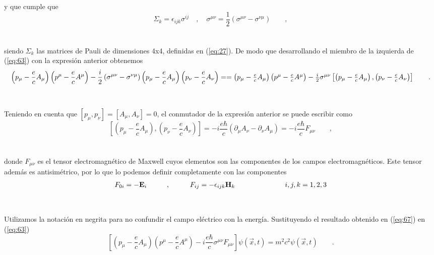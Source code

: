 \documentclass[11pt,letterpaper]{article}     %
\begin{document}
y que cumple que
\begin{equation} \label{eq:65}
\Sigma_k=\epsilon_{ijk} \sigma^{ij} \quad , \quad \sigma^{\mu \nu}=\frac{1}{2}(\sigma^{\mu \nu} - \sigma^{\nu \mu}) \qquad ,
\end{equation} \\ \\
siendo $\Sigma_k$ las matrices de Pauli de dimensiones 4x4, definidas en (\ref{eq:27}). De modo que desarrollando el miembro de la izquierda de (\ref{eq:63}) con la expresión anterior obtenemos
\begin{equation} \label{eq:66}
\left(p_\mu - \frac{e}{c}A_\mu \right)\left(p^\mu - \frac{e}{c}A^\mu \right)-\frac{i}{2} \left(\sigma^{\mu \nu}- \sigma^{\nu \mu} \right)\left(p_\mu - \frac{e}{c}A_\mu \right)\left(p_\nu - \frac{e}{c}A_\nu \right) = $$\\$$ = \left(p_\mu - \frac{e}{c}A_\mu \right)\left(p^\mu - \frac{e}{c}A^\mu \right)-\frac{i}{2}\sigma^{\mu \nu}\left[\left(p_\mu - \frac{e}{c}A_\mu \right),\left(p_\nu - \frac{e}{c}A_\nu \right) \right] \qquad .
\end{equation} \\ \\
Teniendo en cuenta que $[p_\mu,p_\nu]=[A_\mu, A_\nu]=0$, el conmutador de la expresión anterior se puede escribir como 
\begin{equation} \label{eq:67}
\left[(p_\mu - \frac{e}{c}A_\mu),(p_\nu - \frac{e}{c}A_\nu) \right] = -i \frac{e \hbar}{c} ( \partial_\mu A_\nu - \partial_\nu A_\mu)=-i \frac{e \hbar}{c} F_{\mu \nu} \qquad ,
\end{equation} \\ \\
donde $F_{\mu \nu}$ es el tensor electromagnético de Maxwell cuyos elementos son las componentes de los campos electromagnéticos. Este tensor además es antisimétrico, por lo que lo podemos definir completamente con las componentes
\begin{equation} \label{eq:68}
F_{0i}=-\textbf{E}_i  \hspace{1cm}, \hspace{1cm} F_{ij}=-\epsilon_{ijk}\textbf{H}_k  \hspace{2.5cm} i,j,k=1,2,3
\end{equation} \\ \\
Utilizamos la notación en negrita para no confundir el campo eléctrico con la energía. Sustituyendo el resultado obtenido en (\ref{eq:67}) en (\ref{eq:63})
\begin{equation} \label{eq:69}
\left[ (p_\mu - \frac{e}{c}A_\mu)(p^\mu - \frac{e}{c}A^\mu) - i \frac{e \hbar}{c}\sigma^{\mu \nu}F_{\mu \nu} \right] \psi(\vec{x},t)=m^2c^2 \psi(\vec{x},t) \qquad .
\end{equation} \\ \\
\end{document}
